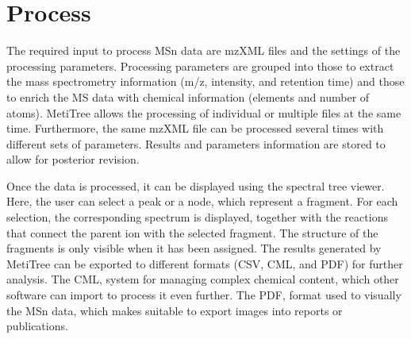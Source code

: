 \documentclass[12pt]{report}
\begin{document}
\newpage
\section{Process}
\newline

The required input to process MSn data are mzXML files and the settings of the processing parameters. Processing parameters are grouped into those to extract the mass spectrometry information (m/z, intensity, and retention time) and those to enrich the MS data with chemical information (elements and number of atoms). MetiTree allows the processing of individual or multiple files at the same time. Furthermore, the same mzXML file can be processed several times with different sets of parameters. Results and parameters information are stored to allow for posterior revision.
 
Once the data is processed, it can be displayed using the spectral tree viewer. Here, the user can select a peak or a node, which represent a fragment. For each selection, the corresponding spectrum is displayed, together with the reactions that connect the parent ion with the selected fragment. The structure of the fragments is only visible when it has been assigned. The results generated by MetiTree can be exported to different formats (CSV, CML, and PDF) for further analysis. The CML, system for managing complex chemical content, which other software can import to process it even further. The PDF, format used to visually the MSn data, which makes suitable to export images into reports or publications. 
\end{document}
